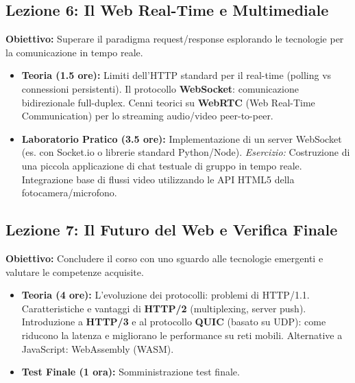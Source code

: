 \documentclass[11pt,a4paper]{article}
\begin{document}
\subsection*{Lezione 6: Il Web Real-Time e Multimediale}
\textbf{Obiettivo:} Superare il paradigma request/response esplorando le tecnologie per la comunicazione in tempo reale.
\begin{itemize}
    \item \textbf{Teoria (1.5 ore):} Limiti dell'HTTP standard per il real-time (polling vs connessioni persistenti). Il protocollo \textbf{WebSocket}: comunicazione bidirezionale full-duplex. Cenni teorici su \textbf{WebRTC} (Web Real-Time Communication) per lo streaming audio/video peer-to-peer.
    \item \textbf{Laboratorio Pratico (3.5 ore):} Implementazione di un server WebSocket (es. con Socket.io o librerie standard Python/Node). \textit{Esercizio:} Costruzione di una piccola applicazione di chat testuale di gruppo in tempo reale. Integrazione base di flussi video utilizzando le API HTML5 della fotocamera/microfono.
\end{itemize}

\subsection*{Lezione 7: Il Futuro del Web e Verifica Finale}
\textbf{Obiettivo:} Concludere il corso con uno sguardo alle tecnologie emergenti e valutare le competenze acquisite.
\begin{itemize}
    \item \textbf{Teoria (4 ore):} L'evoluzione dei protocolli: problemi di HTTP/1.1. Caratteristiche e vantaggi di \textbf{HTTP/2} (multiplexing, server push). Introduzione a \textbf{HTTP/3} e al protocollo \textbf{QUIC} (basato su UDP): come riducono la latenza e migliorano le performance su reti mobili. Alternative a JavaScript: WebAssembly (WASM).
    \item \textbf{Test Finale (1 ora):} Somministrazione test finale.
\end{itemize}
\end{document}

